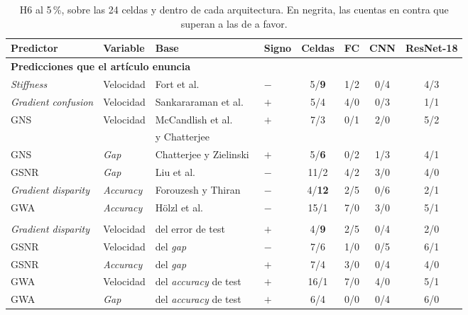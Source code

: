 \begin{table}[ht]
\centering
\footnotesize
\setlength{\tabcolsep}{3.5pt}
\caption{H6 al 5\,\%, sobre las 24 celdas y dentro de cada arquitectura. En negrita, las cuentas en contra que superan a las de a favor.}
\label{tab:h6}
\begin{tabular}{llllcccc}
\toprule
\textbf{Predictor} & \textbf{Variable} & \textbf{Base} & \textbf{Signo} & \textbf{Celdas} & \textbf{FC} & \textbf{CNN} & \textbf{ResNet-18} \\
\midrule
\multicolumn{8}{l}{\textbf{Predicciones que el artículo enuncia}} \\
\emph{Stiffness} & Velocidad & Fort et al.~\cite{fort2019stiffness} & $-$ & 5/\textbf{9} & 1/2 & 0/4 & 4/3 \\
\emph{Gradient confusion} & Velocidad & Sankararaman et al.~\cite{sankararaman2020impact} & $+$ & 5/4 & 4/0 & 0/3 & 1/1 \\
GNS & Velocidad & McCandlish et al.~\cite{mccandlish2018empirical} & $+$ & 7/3 & 0/1 & 2/0 & 5/2 \\
 & & y Chatterjee~\cite{chatterjee2020coherent} & & & & & \\
GNS & \emph{Gap} & Chatterjee y Zielinski~\cite{chatterjee2020making} & $+$ & 5/\textbf{6} & 0/2 & 1/3 & 4/1 \\
GSNR & \emph{Gap} & Liu et al.~\cite{liu2020understanding} & $-$ & 11/2 & 4/2 & 3/0 & 4/0 \\
\emph{Gradient disparity} & \emph{Accuracy} & Forouzesh y Thiran~\cite{forouzesh2021disparity} & $-$ & 4/\textbf{12} & 2/5 & 0/6 & 2/1 \\
GWA & \emph{Accuracy} & Hölzl et al.~\cite{hoelzl2025gradient} & $-$ & 15/1 & 7/0 & 3/0 & 5/1 \\
\addlinespace
\multicolumn{8}{l}{\textbf{Predicciones que esta memoria extrapola, sin contrastar}} \\
\emph{Gradient disparity} & Velocidad & del error de test & $+$ & 4/\textbf{9} & 2/5 & 0/4 & 2/0 \\
GSNR & Velocidad & del \emph{gap} & $-$ & 7/6 & 1/0 & 0/5 & 6/1 \\
GSNR & \emph{Accuracy} & del \emph{gap} & $+$ & 7/4 & 3/0 & 0/4 & 4/0 \\
GWA & Velocidad & del \emph{accuracy} de test & $+$ & 16/1 & 7/0 & 4/0 & 5/1 \\
GWA & \emph{Gap} & del \emph{accuracy} de test & $+$ & 6/4 & 0/0 & 0/4 & 6/0 \\
\bottomrule
\end{tabular}
\end{table}

